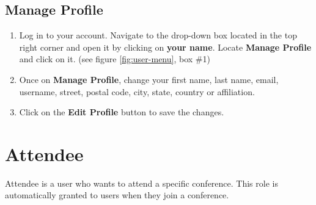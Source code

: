 \documentclass[nochapterpage,nopartpage,noheadingspace,numbersubsubsec,bigchapter,colorback,accentcolor=tud9c,10pt]{tudreport}
\begin{document}

  \section{Manage Profile}

        \begin{enumerate}
            \item   Log in to your account. Navigate to the drop-down box located in the top right corner and open it by clicking on \textbf{your name}. Locate \textbf{Manage Profile} and click on it. (see figure \ref{fig:user-menu}, box \#1)
            \item   Once on \textbf{Manage Profile}, change your first name, last name, email, username, street, postal code, city, state, country or affiliation.
            \item   Click on the \textbf{Edit Profile} button to save the changes.
        \end{enumerate}


  \chapter{Attendee}

    Attendee is a user who wants to attend a specific conference. This role is automatically granted to users when they join a conference.
\end{document}
